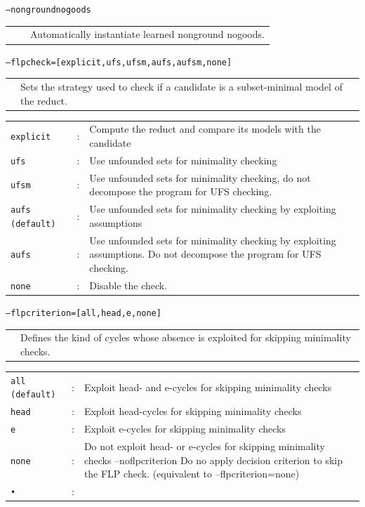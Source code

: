 \documentclass[14pt,a4paper, titlepage]{article}
\begin{document}
\bigskip
\texttt{--nongroundnogoods}
\begin{center}
\begin{tabular}{p{2.5cm} p{0.5cm} p{7.8cm}}
&&Automatically instantiate learned nonground nogoods.\\
\end{tabular}
\end{center}
\bigskip
\texttt{--flpcheck=[explicit,ufs,ufsm,aufs,aufsm,none]}
\begin{center}
\begin{tabular}{p{3cm}  p{7.8cm}} 
 & Sets the strategy used to check if a candidate is a subset-minimal model of the reduct.\\
\end{tabular}
\end{center}
\begin{center}
\begin{tabular}{p{2.5cm}  p{0.5cm} p{7.8cm}  } 
\texttt{explicit}&:&Compute the reduct and compare its models with the candidate\\
\texttt{ufs}&:&Use unfounded sets for minimality checking
\\
\texttt{ufsm}&:&Use unfounded sets for minimality checking, do not decompose the program for UFS checking.\\
\texttt{aufs (default)}&:&Use unfounded sets for minimality checking by exploiting assumptions\\
\texttt{aufs}&:&Use unfounded sets for minimality checking by exploiting assumptions. Do not decompose the program for UFS checking.\\
\texttt{none}&:&Disable the check.\\
\end{tabular}
\end{center}
\bigskip
\texttt{--flpcriterion=[all,head,e,none]}
\begin{center}
\begin{tabular}{p{3cm}  p{7.8cm}} 
 & Defines the kind of cycles whose absence is exploited for skipping minimality checks.\\
\end{tabular}
\end{center}
\begin{center}
\begin{tabular}{p{2.5cm}  p{0.5cm} p{7.8cm}  } 
\texttt{all (default)}&:& Exploit head- and e-cycles for skipping minimality checks\\
\texttt{head}&:&Exploit head-cycles for skipping minimality checks\\
\texttt{e}&:&Exploit e-cycles for skipping minimality checks\\
\texttt{none}&:& Do not exploit head- or e-cycles for skipping minimality checks --noflpcriterion Do no apply decision criterion to skip the FLP check. (equivalent to --flpcriterion=none) \\
\texttt{•}&:&\\
\end{tabular}
\end{center}
\end{document}

